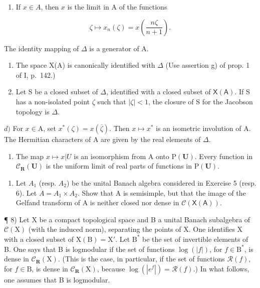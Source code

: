 \begin{enumerate}
\def\labelenumi{\alph{enumi})}
\tightlist
\item
  If \(x \in A\), then \(x\) is the limit in A of the functions
\end{enumerate}

\[
\zeta \mapsto x _ {n} (\zeta) = x \left(\frac {n \zeta}{n + 1}\right).
\]

The identity mapping of \(\Delta\) is a generator of A.

\begin{enumerate}
\def\labelenumi{\alph{enumi})}
\setcounter{enumi}{1}
\item
  The space X(A) is canonically identified with \(\Delta\) (Use assertion g) of prop. 1 of I, p.~142.)
\item
  Let S be a closed subset of \(\Delta\), identified with a closed subset of \(\mathsf{X}(\mathsf{A})\). If S has a non-isolated point \(\zeta\) such that \(|\zeta| < 1\), the closure of S for the Jacobson topology is \(\Delta\).
\end{enumerate}

\(d)\) For \(x \in \mathrm{A}\), set \(x^{*}(\zeta) = x(\overline{\zeta})\). Then \(x \mapsto x^{*}\) is an isometric involution of A. The Hermitian characters of A are given by the real elements of \(\Delta\).

\begin{enumerate}
\def\labelenumi{\alph{enumi})}
\setcounter{enumi}{4}
\tightlist
\item
  The map \(x \mapsto x|U\) is an isomorphism from A onto \(\mathrm{P}(\mathbf{U})\). Every function in \(\mathcal{C}_{\mathbf{R}}(\mathbf{U})\) is the uniform limit of real parts of functions in \(\mathrm{P}(\mathbf{U})\).
\end{enumerate}

\begin{enumerate}
\def\labelenumi{\arabic{enumi})}
\setcounter{enumi}{6}
\tightlist
\item
  Let \(A_{1}\) (resp. \(A_{2}\)) be the unital Banach algebra considered in Exercise 5 (resp. 6). Let \(A = A_{1} \times A_{2}\). Show that A is semisimple, but that the image of the Gelfand transform of A is neither closed nor dense in \(\mathcal{C}(\mathsf{X}(\mathsf{A}))\).
\end{enumerate}

¶ 8) Let X be a compact topological space and B a unital Banach subalgebra of \(\mathcal{C}(\mathrm{X})\) (with the induced norm), separating the points of X. One identifies X with a closed subset of \(\mathrm{X(B)} = \mathrm{X}'\). Let \(\mathrm{B}^*\) be the set of invertible elements of B. One says that B is logmodular if the set of functions \(\log(|f|)\), for \(f \in \mathrm{B}^*\), is dense in \(\mathcal{C}_{\mathbf{R}}(\mathrm{X})\). (This is the case, in particular, if the set of functions \(\mathcal{R}(f)\), for \(f \in \mathrm{B}\), is dense in \(\mathcal{C}_{\mathbf{R}}(\mathrm{X})\), because \(\log(|e^f|) = \mathcal{R}(f)\).) In what follows, one assumes that B is logmodular.

